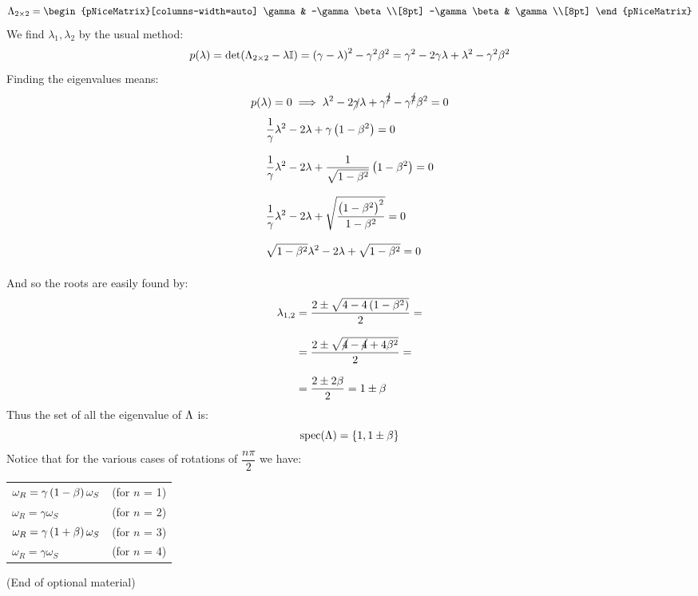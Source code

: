 \begin{equation}
  \lm_{2 \by 2} = \begin{pNiceMatrix}[columns-width=auto]
    \gamma & -\gamma \beta \\[8pt]
    -\gamma \beta & \gamma \\[8pt]
  \end{pNiceMatrix}
\end{equation}
We find $\lambda_1, \lambda_2$ by the usual method:
\begin{equation}
  p(\lambda) = \det(\Lambda_{2 \times 2} - \lambda \mathbb{I}) = \left(\gamma - \lambda\right)^2 - \gamma^2\beta^2 = \gamma^2 -2\gamma\lambda +\lambda^2 - \gamma^2\beta^2
\end{equation}
Finding the eigenvalues means:
\begin{equation}
  p(\lambda) = 0 \implies \lambda^2 -2\cancel{\gamma}\lambda + \gamma^{\cancel{2}}- \gamma^{\cancel{2}}\beta^2 = 0 \\[8pt]
\end{equation}
\begin{equation}
  \begin{split}
    &\dfrac{1}{\gamma}\lambda^2 -2\lambda +\gamma \left(1- \beta^2\right) = 0 \\[8pt]
    &\dfrac{1}{\gamma}\lambda^2 -2\lambda + \dfrac{1}{\sqrt{1-\beta^2}} \left(1- \beta^2\right) = 0 \\[8pt]
    &\dfrac{1}{\gamma}\lambda^2 -2\lambda + \sqrt{\dfrac{\left(1- \beta^2\right)^2}{1-\beta^2}}  = 0 \\[8pt]
    &\sqrt{1- \beta^2}\lambda^2 -2\lambda + \sqrt{1- \beta^2}  = 0 \\[8pt]
  \end{split}
\end{equation}
And so the roots are easily found by:
\begin{equation}
  \begin{split}
    \lambda_{1,2} &= \dfrac{2\pm\sqrt{4 - 4\left(1-\beta^2\right)}}{2} =\\[8pt]
    & = \dfrac{2\pm\sqrt{\cancel{4} - \cancel{4} +4\beta^2}}{2} =\\[8pt]
    & = \dfrac{2 \pm 2\beta}{2} = 1 \pm \beta
  \end{split}
\end{equation}
Thus the set of all the eigenvalue of $\Lambda$ is:
\begin{equation}
  \mathrm{spec}(\Lambda) = \{1, 1 \pm \beta\}
\end{equation}
Notice that for the various cases of rotations of $\dfrac{n\pi}{2}$ we have:
\begin{table}[H]
  \centering
  \begin{tabular}{lc}
    $\omega_R = \gamma \left(1-\beta\right) \omega_S$ & (for $n$ = 1) \\[8pt]
    $\omega_R = \gamma \omega_S$ & (for $n$ = 2) \\[8pt]
    $\omega_R = \gamma \left(1+\beta\right) \omega_S$ & (for $n$ = 3) \\[8pt]
    $\omega_R = \gamma \omega_S$ & (for $n$ = 4) \\[8pt]
  \end{tabular}
\end{table}
(End of optional material)

